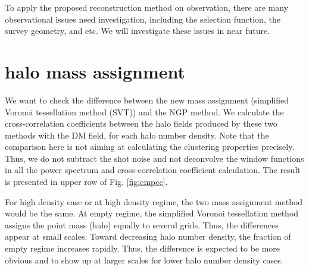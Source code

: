 \documentclass[iop]{emulateapj}
\newcommand{\mpch}{h^{-1} {\rm Mpc}}
\begin{document}
{To apply the proposed reconstruction method on observation, there are many observational issues need investigation, including the selection function, the survey geometry, and etc.
We will investigate these issues in near future.

\appendix
\section{halo mass assignment}

\begin{figure*}
\epsfxsize=18cm
\caption{The upper row shows the cross-correlation coefficients between the halo fields with the simulated DM field.
The solid lines present the result for the halo fields produces by the new mass assignment (simplified voronoi tessellation method).
For comparison, the result for the NGP halo fields is plotted in dotted lines.
From left to right, the halo number density is $2.77\times 10^{-2}$, $2.77\times 10^{-3}$, $2.77\times 10^{-4}$ $(\mpch)^{-3}$, respectively.
The bottom row shows the cross-correlation coefficients with the initial condition.
In the calculation, shot noise is not subtracted and window functions are not deconvolved,
since we want to see how different the two halo fields are.
}
\label{fig:cmpcc}
\end{figure*}

We want to check the difference between the new mass assignment (simplified Voronoi tessellation method (SVT)) and the NGP method.
We calculate the cross-correlation coefficients between the halo fields produced by these two methods with the DM field, for each halo number density.
Note that the comparison here is not aiming at calculating the clustering properties precisely.
Thus, we do not subtract the shot noise and not deconvolve the window functions in all the power spectrum and cross-correlation coefficient calculation.
The result is presented in upper row of Fig. \ref{fig:cmpcc}.

For high density case or at high density regime, the two mass assignment method would be the same.
At empty regime, the simplified Voronoi tessellation method assigns the point mass (halo) equally to several grids.
Thus, the differences appear at small scales.
Toward decreasing halo number density, the fraction of empty regime increases rapidly.
Thus, the difference is expected to be more obvious and to show up at larger scales for lower halo number density cases.

}
\end{document}

